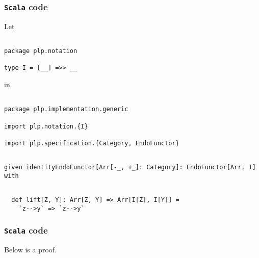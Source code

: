 \documentclass[11pt]{article}
\newcommand{\code}{\subsubsection{{\tt Scala} code}\begingroup\rm \vspace{12pt}}
\def\edefn{\endgroup\par\pagebreak[2]\addvspace{\medskipamount}}
\let\ecode=\edefn
\begin{document}
\code
Let

\vspace{6pt}
\begin{mdframed}[backgroundcolor=lightgray!20] 
\begin{lstlisting} 

package plp.notation

type I = [__] =>> __
\end{lstlisting}
\end{mdframed}

in

\vspace{6pt}
\begin{mdframed}[backgroundcolor=lightgray!20] 
\begin{lstlisting} 

package plp.implementation.generic

import plp.notation.{I}

import plp.specification.{Category, EndoFunctor}
\end{lstlisting}
\end{mdframed}
\vspace{6pt}
\clearpage
\begin{mdframed}[backgroundcolor=lightgray!20] 
\begin{lstlisting}

given identityEndoFunctor[Arr[-_, +_]: Category]: EndoFunctor[Arr, I] with
\end{lstlisting}
\end{mdframed}
\vspace{6pt}
\begin{mdframed}[backgroundcolor=lightgray!20] 
\begin{lstlisting}

  def lift[Z, Y]: Arr[Z, Y] => Arr[I[Z], I[Y]] =
    `z-->y` => `z-->y`
\end{lstlisting}
\end{mdframed}
\ecode

\code
Below is a proof.
\end{document}
